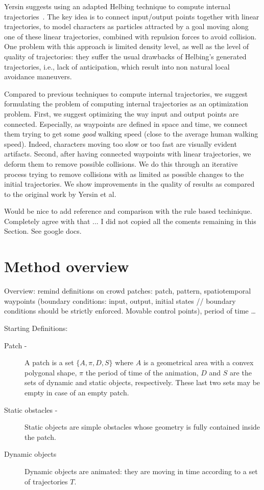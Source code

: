 \documentclass[conference]{acmsiggraph}
\newcommand\julien[1]{{\color{RubineRed}#1}}
\newcommand\claudia[1]{{\color{Purple}#1}}
\newcommand\panayiotis[1]{{\color{Green}#1}}
\newcommand\note[1]{{\color{Red}#1}}
\begin{document}
Yersin suggests using an adapted Helbing technique to compute internal trajectories~\cite{Helbing:2005}. The key idea is to connect input/output points together with linear trajectories, to model characters as particles attracted by a goal moving along one of these linear trajectories, combined with repulsion forces to avoid collision. One problem with this approach is limited density level, as well as the level of quality of trajectories: they suffer the usual drawbacks of Helbing's generated trajectories, i.e., lack of anticipation, which result into non natural local avoidance maneuvers. 

Compared to previous techniques to compute internal trajectories, we suggest formulating the problem of computing internal trajectories as an optimization problem. First, we suggest optimizing the way input and output points are connected. Especially, as waypoints are defined in space and time, we connect them trying to get some {\it good} walking speed (close to the average human walking speed). Indeed, characters moving too slow or too fast are visually evident artifacts. Second, after having connected waypoints with linear trajectories, we deform them to remove possible collisions. We do this through an iterative process trying to remove collisions with as limited as possible changes to the initial trajectories. We show improvements in the quality of results as compared to the original work by Yersin et al. 

\julien{Would be nice to add reference and comparison with the rule based techinique. } \panayiotis{Completely agree with that ... }
\claudia{I did not copied all the coments remaining in this Section. See google docs.}


\section{Method overview \label{the_method}}

\note{Overview: remind definitions on crowd patches: patch, pattern, spatiotemporal waypoints (boundary conditions: input, output, initial states // boundary conditions should be strictly enforced. Movable control points), period of time \dots}

\note{Starting Definitions:}

\begin{description}

\item[Patch - ]{A patch is a set $\{ A, \pi, D, S\}$ where $A$ is a geometrical area with a convex polygonal shape, $\pi$ the period of time of the animation, $D$ and $S$ are the sets of dynamic and static objects, respectively. These last two sets may be empty in case of an empty patch.}

\item[Static obstacles -]{Static objects are simple obstacles whose geometry is fully contained inside the patch.}

\item[Dynamic objects]{Dynamic objects are animated: they are moving in time according to a set of trajectories $T$.}

\end{description}
\end{document}
